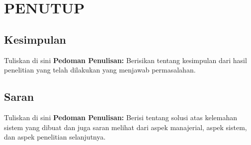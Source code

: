 \chapter{PENUTUP}
\section{Kesimpulan}


Tuliskan di sini \textbf{Pedoman Penulisan:} Berisikan tentang kesimpulan dari hasil penelitian yang telah dilakukan yang menjawab permasalahan.


\section{Saran}


Tuliskan di sini \textbf{Pedoman Penulisan:} Berisi tentang solusi atas kelemahan sistem yang dibuat dan juga saran melihat dari aspek manajerial, aspek sistem, dan aspek penelitian selanjutnya.


